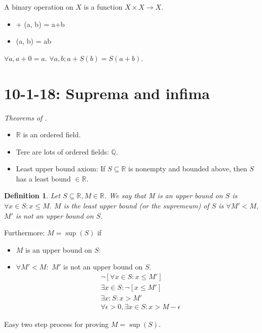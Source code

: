 \documentclass[12pt]{article}
\newtheorem*{definition}{Definition}
\newcommand{\RR}{\mathbb{R}}
\newcommand{\QQ}{\mathbb{Q}}
\begin{document}
A binary operation on $X$ is a function $X \times X \to X$.

\begin{itemize}
  \item + (a, b) = a+b
  \item \cdot (a, b) = ab
  \end{itemize}


  $\forall a, a + 0 = a$. $\forall a, b; a + S(b) = S(a+b)$.


  \section{10-1-18: Suprema and infima}


  {\it Theorems of \RR.} 

  \begin{itemize}
    \item $\RR$ is an ordered field.
    \item Tere are lots of ordered fields: $\QQ$.
    \item Least upper bound axiom: If $S \subseteq \RR$ is nonempty and bounded above, then $S$ has a least bound $\in \RR$.
  \end{itemize}

  \begin{definition}
    Let $S \subseteq \RR, M \in \RR$.  We say that M is an upper bound on $S$ is $\forall x \in S: x \leq M$.  $M$ is the least upper bound (or the supremeum) of $S$ is $\forall M' < M$, $M'$ is not an upper bound on $S$.
  \end{definition}

  Furthermore: $M = \sup(S)$ if

  \begin{itemize}
    \item $M$ is an upper bound on $S$:
    \item $\forall M' < M:$ $M'$ is not an upper bound on $S$.
      \begin{align*}
        & \neg [ \forall x \in S : x \leq M'] \\
        & \exists x \in S: \neg [x \leq M' ] \\
        & \exists x : S: x > M' \\
        & \boxed{\forall \epsilon > 0, \exists x \in S: x > M - \epsilon}
      \end{align*}
  \end{itemize}

  Easy two step process for proving $M = \sup(S)$.
\end{document}
